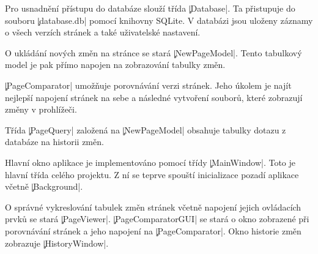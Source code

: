 Pro usnadnění přístupu do databáze slouží třída \c|Database|.
Ta přistupuje do souboru \c|database.db| %
pomocí knihovny SQLite.
V databázi jsou uloženy záznamy o všech verzích stránek a také uživatelské nastavení.

O ukládání nových změn na stránce se stará \c|NewPageModel|. Tento tabulkový model je pak přímo napojen na zobrazování tabulky změn.

\c|PageComparator| umožňuje porovnávání verzi stránek.
Jeho úkolem je najít nejlepší napojení stránek na sebe a následné vytvoření souborů, které zobrazují změny v prohlížeči.

Třída \c|PageQuery| založená na \c|NewPageModel| obsahuje tabulky dotazu z databáze na historii změn.

Hlavní okno aplikace je implementováno pomocí třídy \c|MainWindow|. Toto je hlavní třída celého projektu.
Z ní se teprve spouští inicializace pozadí aplikace včetně \c|Background|.

O správné vykreslování tabulek změn stránek včetně napojení jejich ovládacích prvků se stará \c|PageViewer|.
\c|PageComparatorGUI| se stará o okno zobrazené při porovnávání stránek a jeho napojení na \c|PageComparator|.
Okno historie změn zobrazuje \c|HistoryWindow|.

